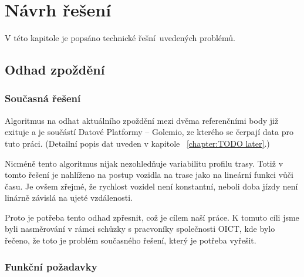 
\chapter{Návrh řešení}

V této kapitole je popsáno technické řešní uvedených problémů.

\section{Odhad zpoždění}

\subsection{Současná řešení}

Algoritmus na odhat aktuálního zpoždění mezi dvěma referenčními body již exituje a je součástí Datové Platformy -- Golemio, ze kterého se čerpají data pro tuto práci. (Detailní popis dat uveden v kapitole ~\ref{chapter:TODO later}.)

\bigbreak

Nicméně tento algoritmus nijak nezohledňuje variabilitu profilu trasy. Totiž v tomto řešení je nahlíženo na postup vozidla na trase jako na lineární funkci vůči času. Je ovšem zřejmé, že rychlost vozidel není konstantní, neboli doba jízdy není linárně závislá na ujeté vzdálenosti.

\bigbreak

Proto je potřeba tento odhad zpřesnit, což je cílem naší práce. K tomuto cíli jsme byli nasměrování v rámci schůzky s pracvoníky společnosti OICT, kde bylo řečeno, že toto je problém současného řešení, který je potřeba vyřešit. 

\subsection{Funkční požadavky}

